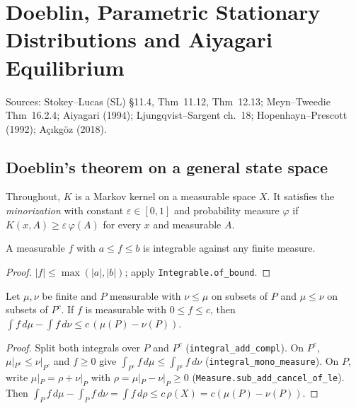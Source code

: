 \chapter{Doeblin, Parametric Stationary Distributions and Aiyagari Equilibrium}
\label{chap:aiyagari}

Sources: Stokey--Lucas (SL) \S11.4, Thm~11.12, Thm~12.13; Meyn--Tweedie Thm~16.2.4;
Aiyagari (1994); Ljungqvist--Sargent ch.~18; Hopenhayn--Prescott (1992); A\c{c}{\i}kg\"oz (2018).

\section{Doeblin's theorem on a general state space}
\label{sec:doeblin_general}

Throughout, $K$ is a Markov kernel on a measurable space $X$. It satisfies the
\emph{minorization} with constant $\varepsilon\in[0,1]$ and probability measure $\varphi$ if
$K(x,A) \ge \varepsilon\,\varphi(A)$ for every $x$ and measurable $A$.

\begin{lemma}
\label{lem:integrable_of_bounded}
\leanok
A measurable $f$ with $a \le f \le b$ is integrable against any finite measure.
\end{lemma}
\begin{proof}
\leanok
$|f| \le \max(|a|,|b|)$; apply \texttt{Integrable.of\_bound}.
\end{proof}

\begin{lemma}
\label{lem:integral_sub_le_hahn}
\leanok
Let $\mu,\nu$ be finite and $P$ measurable with $\nu \le \mu$ on subsets of $P$ and $\mu\le\nu$ on subsets
of $P^c$. If $f$ is measurable with $0 \le f \le c$, then $\int f\,d\mu - \int f\,d\nu \le c\,(\mu(P) - \nu(P))$.
\end{lemma}
\begin{proof}
\leanok
{}
Split both integrals over $P$ and $P^c$ (\texttt{integral\_add\_compl}). On $P^c$, $\mu|_{P^c} \le \nu|_{P^c}$
and $f\ge0$ give $\int_{P^c} f\,d\mu \le \int_{P^c} f\,d\nu$ (\texttt{integral\_mono\_measure}). On $P$, write
$\mu|_P = \rho + \nu|_P$ with $\rho = \mu|_P - \nu|_P \ge 0$ (\texttt{Measure.sub\_add\_cancel\_of\_le}). Then
$\int_P f\,d\mu - \int_P f\,d\nu = \int f\,d\rho \le c\,\rho(X) = c(\mu(P) - \nu(P))$.
\end{proof}


